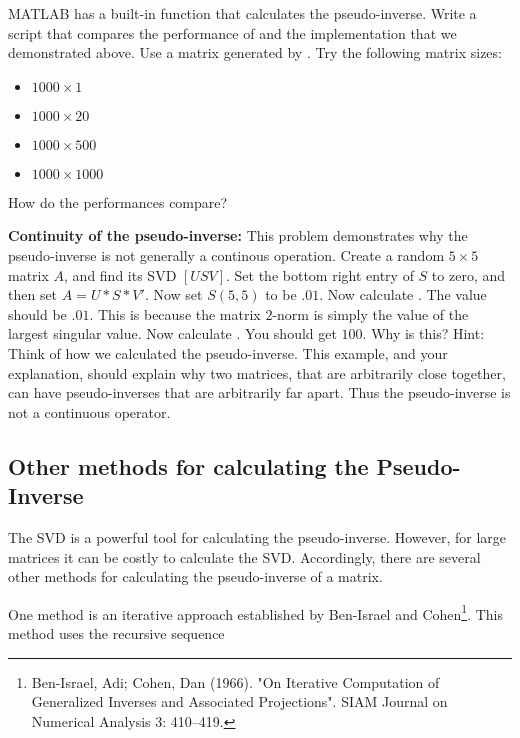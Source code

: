 \begin{problem}
MATLAB has a built-in function  that calculates the pseudo-inverse. Write a script that compares the performance of  and the implementation that we demonstrated above. Use a matrix generated by . Try the following matrix sizes:
\begin{itemize}
\item $1000 \times 1$
\item $1000 \times 20$
\item $1000 \times 500$
\item $1000 \times 1000$
\end{itemize}
How do the performances compare?
\end{problem}

\begin{problem}
{\bf Continuity of the pseudo-inverse:} This problem demonstrates why the pseudo-inverse is not generally a continous operation. Create a random $5 \times 5$ matrix $A$, and find its SVD $[U S V]$. Set the bottom right entry of $S$ to zero, and then set $A = U*S*V'$. Now set $S(5,5)$ to be $.01$. Now calculate . The value should be $.01$. This is because the matrix $2$-norm is simply the value of the largest singular value. Now calculate . You should get $100$. Why is this? Hint: Think of how we calculated the pseudo-inverse. This example, and your explanation, should explain why two matrices, that are arbitrarily close together, can have pseudo-inverses that are arbitrarily far apart. Thus the pseudo-inverse is not a continuous operator.
\end{problem}

\subsection*{Other methods for calculating the Pseudo-Inverse}

The SVD is a powerful tool for calculating the pseudo-inverse. However, for large matrices it can be costly to calculate the SVD. Accordingly, there are several other methods for calculating the pseudo-inverse of a matrix.

One method is an iterative approach established by Ben-Israel and Cohen\footnote{Ben-Israel, Adi; Cohen, Dan (1966). "On Iterative Computation of Generalized Inverses and Associated Projections". SIAM Journal on Numerical Analysis 3: 410–419.}. This method uses the recursive sequence

